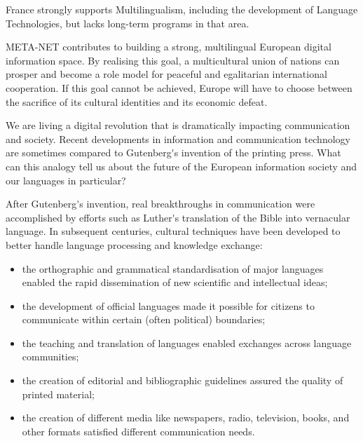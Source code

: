 \documentclass[]{../metanetpaper}
\begin{document}
\begin{multicols}{2}
France strongly supports Multilingualism, including the development of
Language Technologies, but lacks long-term programs in that area.

META-NET contributes to building a strong, multilingual European
digital information space. By realising this goal, a multicultural
union of nations can prosper and become a role model for peaceful and
egalitarian international cooperation. If this goal cannot be
achieved, Europe will have to choose between the sacrifice of its cultural
identities and its economic defeat.
\end{multicols}

\clearpage


\begin{multicols}{2}

We are living a digital revolution that is dramatically impacting communication and society. Recent developments in information and communication technology are sometimes compared to Gutenberg{\mbox '}s invention of the printing press. What can this analogy tell us about the future of the European information society and our languages in particular?


After Gutenberg{\mbox '}s invention, real breakthroughs in communication were accomplished by efforts such as Luther{\mbox '}s translation of the Bible into vernacular language. In subsequent centuries, cultural techniques have been developed to better handle language processing and knowledge exchange:

\begin{itemize}
\item the orthographic and grammatical standardisation of major languages enabled the rapid dissemination of new scientific and intellectual ideas;
\item the development of official languages made it possible for citizens to communicate within certain (often political) boundaries;
\item the teaching and translation of languages enabled exchanges across language communities;
\item the creation of editorial and bibliographic guidelines assured the quality of printed material;
\item the creation of different media like newspapers, radio, television, books, and other formats satisfied different communication needs. 
\end{itemize}


\end{multicols}
\end{document}

